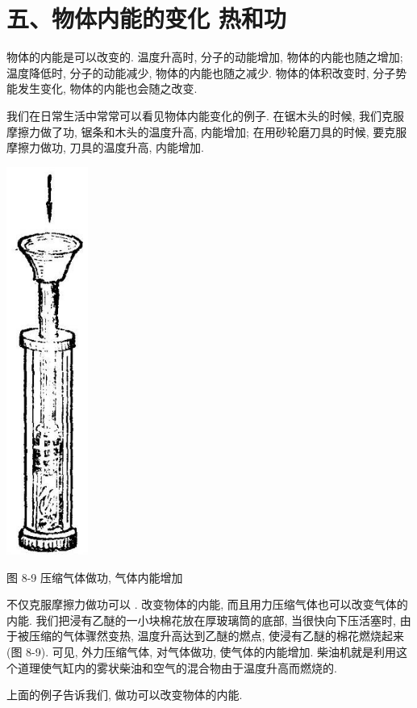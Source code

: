 \documentclass[10pt]{article}
\begin{document}
\section*{五、物体内能的变化 热和功}

物体的内能是可以改变的. 温度升高时, 分子的动能增加, 物体的内能也随之增加; 温度降低时, 分子的动能减少, 物体的内能也随之减少. 物体的体积改变时, 分子势能发生变化, 物体的内能也会随之改变.

我们在日常生活中常常可以看见物体内能变化的例子. 在锯木头的时候, 我们克服摩擦力做了功, 锯条和木头的温度升高, 内能增加; 在用砂轮磨刀具的时候, 要克服摩擦力做功, 刀具的温度升高, 内能增加.

\begin{center}
\includegraphics[max width=0.2\textwidth]{images/01912d55-147c-70aa-b0e0-1782a122f948_245_993427.jpg}
\end{center}

图 8-9 压缩气体做功, 气体内能增加

不仅克服摩擦力做功可以 . 改变物体的内能, 而且用力压缩气体也可以改变气体的内能. 我们把浸有乙醚的一小块棉花放在厚玻璃筒的底部, 当很快向下压活塞时, 由于被压缩的气体骤然变热, 温度升高达到乙醚的燃点, 使浸有乙醚的棉花燃烧起来 (图 8-9). 可见, 外力压缩气体, 对气体做功, 使气体的内能增加. 柴油机就是利用这个道理使气缸内的雾状柴油和空气的混合物由于温度升高而燃烧的.

上面的例子告诉我们, 做功可以改变物体的内能.
\end{document}
